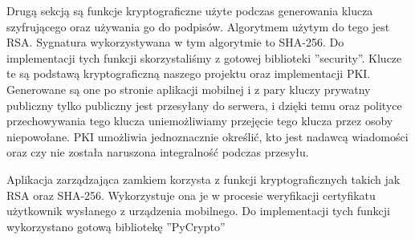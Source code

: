 Drugą sekcją są funkcje kryptograficzne użyte podczas generowania klucza szyfrującego oraz używania go do podpisów. Algorytmem użytym do tego jest RSA. Sygnatura wykorzystywana w tym algorytmie to SHA-256. Do implementacji tych funkcji skorzystaliśmy z gotowej biblioteki ''security''. Klucze te są podstawą kryptograficzną naszego projektu oraz implementacji PKI. Generowane są one po stronie aplikacji mobilnej i z pary kluczy prywatny publiczny tylko publiczny jest przesyłany do serwera, i dzięki temu oraz polityce przechowywania tego klucza uniemożliwiamy przejęcie tego klucza przez osoby niepowołane. PKI umożliwia jednoznacznie określić, kto jest nadawcą wiadomości oraz czy nie została naruszona integralność podczas przesyłu.

Aplikacja zarządzająca zamkiem korzysta z funkcji kryptograficznych takich jak RSA oraz SHA-256. Wykorzystuje ona je w procesie weryfikacji certyfikatu użytkownik wysłanego z urządzenia mobilnego. Do implementacji tych funkcji wykorzystano gotową bibliotekę ''PyCrypto''

\newpage
